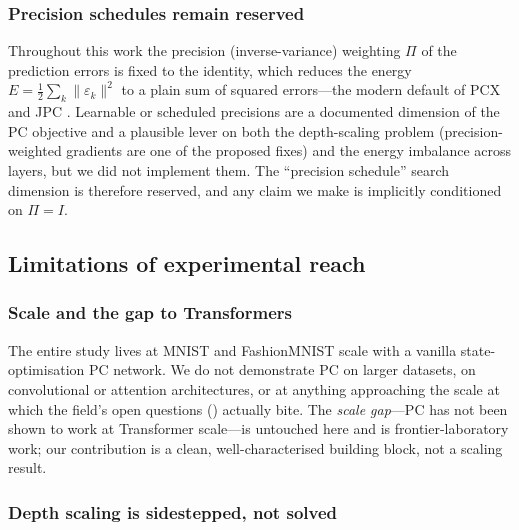 \subsubsection{Precision schedules remain reserved}

Throughout this work the precision (inverse-variance) weighting $\Pi$ of the
prediction errors is fixed to the identity, which reduces the energy
$E = \tfrac12 \sum_k \lVert \varepsilon_k \rVert^2$ to a plain sum of squared
errors---the modern default of PCX and JPC \citep{pinchetti2024pcx, millidge2024jpc}.
Learnable or scheduled precisions are a documented dimension of the PC objective and
a plausible lever on both the depth-scaling problem (precision-weighted gradients are
one of the proposed fixes) and the energy imbalance across layers, but we did not
implement them. The ``precision schedule'' search dimension is therefore reserved,
and any claim we make is implicitly conditioned on $\Pi = I$.

\subsection{Limitations of experimental reach}

\subsubsection{Scale and the gap to Transformers}

The entire study lives at MNIST and FashionMNIST scale with a vanilla
state-optimisation PC network. We do not demonstrate PC on larger datasets, on
convolutional or attention architectures, or at anything approaching the scale at
which the field's open questions () actually bite. The
\emph{scale gap}---PC has not been shown to work at Transformer scale---is untouched
here and is frontier-laboratory work; our contribution is a clean, well-characterised
building block, not a scaling result.

\subsubsection{Depth scaling is sidestepped, not solved}

